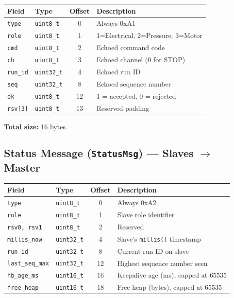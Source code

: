 \documentclass[11pt,a4paper]{article}
\begin{document}
\begin{center}
\begin{tabular}{llcl}
\toprule
\textbf{Field} & \textbf{Type} & \textbf{Offset} & \textbf{Description} \\
\midrule
\texttt{type}    & \texttt{uint8\_t}  & 0  & Always 0xA1 \\
\texttt{role}    & \texttt{uint8\_t}  & 1  & 1=Electrical, 2=Pressure, 3=Motor \\
\texttt{cmd}     & \texttt{uint8\_t}  & 2  & Echoed command code \\
\texttt{ch}      & \texttt{uint8\_t}  & 3  & Echoed channel (0 for STOP) \\
\texttt{run\_id} & \texttt{uint32\_t} & 4  & Echoed run ID \\
\texttt{seq}     & \texttt{uint32\_t} & 8  & Echoed sequence number \\
\texttt{ok}      & \texttt{uint8\_t}  & 12 & 1 = accepted, 0 = rejected \\
\texttt{rsv[3]}  & \texttt{uint8\_t}  & 13 & Reserved padding \\
\bottomrule
\end{tabular}
\end{center}

\textbf{Total size:} 16 bytes.

\subsection{Status Message (\texttt{StatusMsg}) --- Slaves $\to$ Master}

\begin{center}
\begin{tabular}{llcl}
\toprule
\textbf{Field} & \textbf{Type} & \textbf{Offset} & \textbf{Description} \\
\midrule
\texttt{type}          & \texttt{uint8\_t}  & 0  & Always 0xA2 \\
\texttt{role}          & \texttt{uint8\_t}  & 1  & Slave role identifier \\
\texttt{rsv0, rsv1}    & \texttt{uint8\_t}  & 2  & Reserved \\
\texttt{millis\_now}   & \texttt{uint32\_t} & 4  & Slave's \texttt{millis()} timestamp \\
\texttt{run\_id}       & \texttt{uint32\_t} & 8  & Current run ID on slave \\
\texttt{last\_seq\_max}& \texttt{uint32\_t} & 12 & Highest sequence number seen \\
\texttt{hb\_age\_ms}   & \texttt{uint16\_t} & 16 & Keepalive age (ms), capped at 65535 \\
\texttt{free\_heap}    & \texttt{uint16\_t} & 18 & Free heap (bytes), capped at 65535 \\
\bottomrule
\end{tabular}
\end{center}
\end{document}
